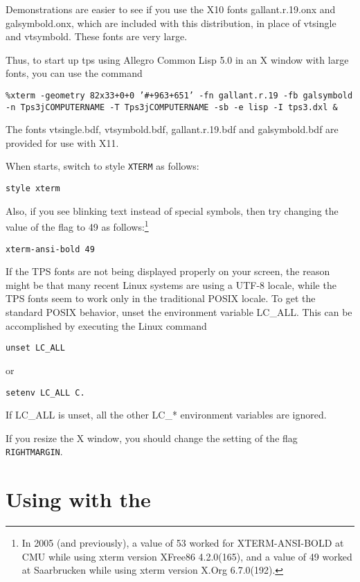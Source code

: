   Demonstrations are easier to see if you use the X10 fonts gallant.r.19.onx
and galsymbold.onx, which are included with this distribution, in place of
vtsingle and vtsymbold.  These fonts are very large.

Thus, to start up tps using Allegro Common Lisp 5.0  in an X window
with large fonts, you can use the command
\begin{alltt}
{\tt \%xterm -geometry 82x33+0+0 '\#+963+651' -fn gallant.r.19 -fb galsymbold  -n Tps3jCOMPUTERNAME -T Tps3jCOMPUTERNAME -sb -e lisp -I tps3.dxl \&}
\end{alltt}

The fonts vtsingle.bdf, vtsymbold.bdf, gallant.r.19.bdf and galsymbold.bdf
are provided for use with X11.

When {\TPS} starts, switch to style
{\tt XTERM} as follows:

\begin{alltt}
{\tt <0>style xterm}
\end{alltt}

Also, if you see blinking text instead of special symbols,
then try changing the value of the flag 
to 49 as follows:\footnote{In 2005 (and previously), a value of 53
worked for XTERM-ANSI-BOLD at
CMU while using xterm version XFree86 4.2.0(165), and a value of 49
worked at Saarbrucken while using xterm version X.Org 6.7.0(192).}

\begin{alltt}
{\tt <0>xterm-ansi-bold 49}
\end{alltt}

If the TPS fonts are not being displayed properly on your screen, the
reason might be that many recent Linux systems are using a UTF-8 
 locale,
while the TPS fonts seem to work only in the traditional POSIX
locale. To get the standard POSIX behavior, unset the environment
variable LC\_ALL. This can be accomplished by executing the Linux command
\begin{alltt}
{\tt unset LC\_ALL}
\end{alltt}
or
\begin{alltt}
{\tt setenv LC\_ALL C.}
\end{alltt}
If LC\_ALL is unset, all the other LC\_* environment variables are ignored.

If you resize the X window, you should change the setting of the flag
{\tt RIGHTMARGIN}.

\section{Using {\TPS} with the }\label{using-java}

